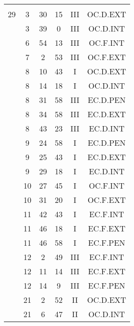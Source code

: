 \documentclass[12pt, a4paper]{article}
\begin{document}
\begin{multicols}{3}
{\begin{tabular}{c c c c c c}
	 	 	 	 & & & & & \\%
	 	 	 	29 & 3 & 30 & 15 & III & OC.D.EXT\\%
	 	 	 	 & 3 & 39 & 0 & III & OC.D.INT\\%
	 	 	 	 & 6 & 54 & 13 & III & OC.F.INT\\%
	 	 	 	 & 7 & 2 & 53 & III & OC.F.EXT\\%
	 	 	 	 & 8 & 10 & 43 & I & OC.D.EXT\\%
	 	 	 	 & 8 & 14 & 18 & I & OC.D.INT\\%
	 	 	 	 & 8 & 31 & 58 & III & EC.D.PEN\\%
	 	 	 	 & 8 & 34 & 58 & III & EC.D.EXT\\%
	 	 	 	 & 8 & 43 & 23 & III & EC.D.INT\\%
	 	 	 	 & 9 & 24 & 58 & I & EC.D.PEN\\%
	 	 	 	 & 9 & 25 & 43 & I & EC.D.EXT\\%
	 	 	 	 & 9 & 29 & 18 & I & EC.D.INT\\%
	 	 	 	 & 10 & 27 & 45 & I & OC.F.INT\\%
	 	 	 	 & 10 & 31 & 20 & I & OC.F.EXT\\%
	 	 	 	 & 11 & 42 & 43 & I & EC.F.INT\\%
	 	 	 	 & 11 & 46 & 18 & I & EC.F.EXT\\%
	 	 	 	 & 11 & 46 & 58 & I & EC.F.PEN\\%
	 	 	 	 & 12 & 2 & 49 & III & EC.F.INT\\%
	 	 	 	 & 12 & 11 & 14 & III & EC.F.EXT\\%
	 	 	 	 & 12 & 14 & 9 & III & EC.F.PEN\\%
	 	 	 	 & 21 & 2 & 52 & II & OC.D.EXT\\%
	 	 	 	 & 21 & 6 & 47 & II & OC.D.INT\\%

\end{tabular}}
\end{multicols}
\end{document}
